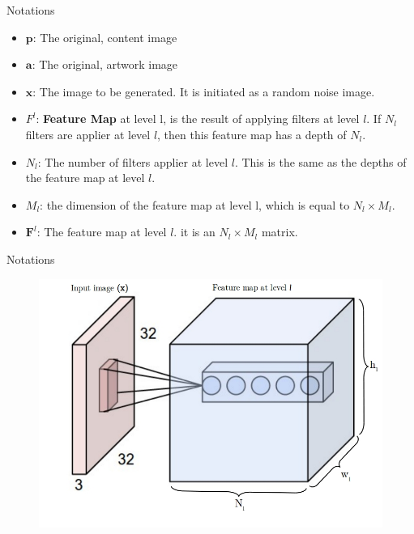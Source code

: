 \documentclass{beamer}
\begin{document}
\begin{frame}{Notations}
    \begin{itemize}
        \item $\mathbf{p}$: The original, content image
        \item $\mathbf{a}$: The original, artwork image
        \item $\mathbf{x}$: The image to be generated. It is initiated as a
            random noise image.
        \item $F^l$: \textbf{Feature Map} at level l, is the result of applying
            filters at level $l$. If $N_l$ filters are applier at level $l$,
            then this feature map has a depth of $N_l$.
        \item $N_l$: The number of filters applier at level $l$. This is
            the same as the depths of the feature map at level
            $l$.
        \item $M_l$: the dimension of the feature map at level l, which
            is equal to $N_l \times M_l$.
        \item $\mathbf{F}^l$: The feature map at level $l$. it is an
            $N_l \times M_l$ matrix.
    \end{itemize}
\end{frame}



\begin{frame}{Notations}
    \begin{figure}[H]
        \centering
        \includegraphics[width=.8\textwidth]{img/levels}
    \end{figure}
\end{frame}
\end{document}
